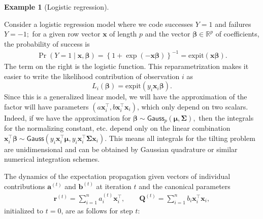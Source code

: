 \documentclass[
  11pt,
  letterpaper,
]{scrbook}
\theoremstyle{plain}
\theoremstyle{plain}
\theoremstyle{definition}
\theoremstyle{definition}
\theoremstyle{definition}
\newtheorem{example}{Example}[chapter]
\theoremstyle{plain}
\theoremstyle{remark}
\begin{document}
\begin{example}[Logistic
regression]\protect\hypertarget{exm-logistic-ep}{}\label{exm-logistic-ep}

Consider a logistic regression model where we code successes \(Y=1\) and
failures \(Y=-1;\) for a given row vector \(\mathbf{x}\) of length \(p\)
and the vector \(\boldsymbol{\beta} \in \mathbb{R}^p\) of coefficients,
the probability of success is \begin{align*}
\Pr(Y=1 \mid \mathbf{x}, \boldsymbol{\beta}) = \left\{1+\exp(-\mathbf{x}\boldsymbol{\beta})\right\}^{-1} = \mathrm{expit}(\mathbf{x}\boldsymbol{\beta}).
\end{align*} The term on the right is the logistic function. This
reparametrization makes it easier to write the likelihood contribution
of observation \(i\) as
\[L_i(\boldsymbol{\beta}) = \mathrm{expit}(y_i \mathbf{x}_i\boldsymbol{\beta}).\]
Since this is a generalized linear model, we will have the approximation
of the factor will have parameters
\((a\mathbf{x}_i^\top, b\mathbf{x}_i^\top\mathbf{x}_i)\), which only
depend on two scalars. Indeed, if we have the approximation for
\(\boldsymbol{\beta} \sim \mathsf{Gauss}_p(\boldsymbol{\mu}, \boldsymbol{\Sigma}),\)
then the integrals for the normalizing constant, etc. depend only on the
linear combination
\(\mathbf{x}_i^\top\boldsymbol{\beta} \sim \mathsf{Gauss}(y_i \mathbf{x}_i^\top\boldsymbol{\mu}, y_i \mathbf{x}_i^\top\boldsymbol{\Sigma}\mathbf{x}_i).\)
This means all integrals for the tilting problem are unidimensional and
can be obtained by Gaussian quadrature or similar numerical integration
schemes.

The dynamics of the expectation propagation given vectors of individual
contributions \(\boldsymbol{a}^{(t)}\) and \(\boldsymbol{b}^{(t)}\) at
iteration \(t\) and the canonical parameters \begin{align*}
\boldsymbol{r}^{(t)} = \sum_{i=1}^n a_i^{(t)}\mathbf{x}_i^\top, \qquad \mathbf{Q}^{(t)} = \sum_{i=1}^n b_i\mathbf{x}_i^\top\mathbf{x}_i,
\end{align*} initialized to \(t=0\), are as follows for step \(t\):


\end{example}
\end{document}

